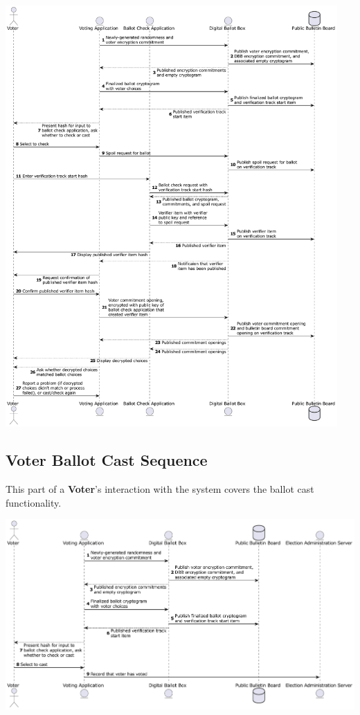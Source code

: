 \documentclass[10pt,letterpaper]{article}
\begin{document}
\includegraphics[width=0.95\textwidth]{diagrams/seq-voter-ballot-check.pdf}

\pagebreak
\subsection{Voter Ballot Cast Sequence}
\hypertarget{voter-ballot-cast-sequence}{}

This part of a \textbf{Voter}'s interaction with the system covers the ballot cast functionality.

\includegraphics[width=\textwidth]{diagrams/seq-voter-ballot-cast.pdf}
\end{document}
